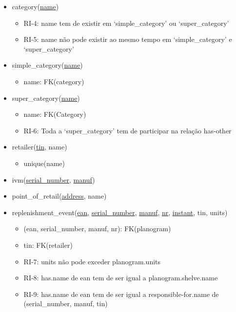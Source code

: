 \documentclass{article}
\newcommand{\bpoint}{\item[$\bullet$]}
\newenvironment{myitemize}
{ \begin{itemize}
	\setlength{\itemsep}{5pt}
	\setlength{\parskip}{0pt}
	\setlength{\parsep}{0pt} }
{ \end{itemize}	}
\begin{document}
\begin{myitemize}
		\vspace{2mm}

	 	\item[]{category(\underline{name})}
		\begin{myitemize}
			\bpoint RI-4: name tem de existir em `simple\_category' ou `super\_category'
			\bpoint RI-5: name não pode existir ao mesmo tempo em `simple\_category' e `super\_category'
		\end{myitemize}

		\vspace{2mm}

	 	\item[] simple\_category(\underline{name})
		\begin{myitemize}
			\bpoint name: FK(category)
		\end{myitemize}

		\vspace{2mm}

	 	\item[] super\_category(\underline{name})
		\begin{myitemize}
			\bpoint name: FK(Category)
			\bpoint RI-6: Toda a `super\_category' tem de participar na relação has-other
		\end{myitemize}

		\vspace{2mm}

	 	\item[] retailer(\underline{tin}, name)
		\begin{myitemize}
			\bpoint unique(name)
		\end{myitemize}

		\vspace{2mm}

		\item[] ivm(\underline{serial\_number}, \underline{manuf})

		\vspace{2mm}

		\item[] point\_of\_retail(\underline{address}, name)

		\vspace{2mm}

	\item[] replenishment\_event(\underline{ean}, \underline{serial\_number}, \underline{manuf}, \underline{nr}, \underline{instant}, tin, units)
		\begin{myitemize}
			\bpoint (ean, serial\_number, manuf, nr): FK(planogram)
			\bpoint tin: FK(retailer)
			\bpoint RI-7: units não pode exceder planogram.units
			\bpoint RI-8: has.name de ean tem de ser igual a planogram.shelve.name
			\bpoint RI-9: has.name de ean tem de ser igual a responsible-for.name de (serial\_number, manuf, tin)


\end{myitemize}
\end{myitemize}
\end{document}
